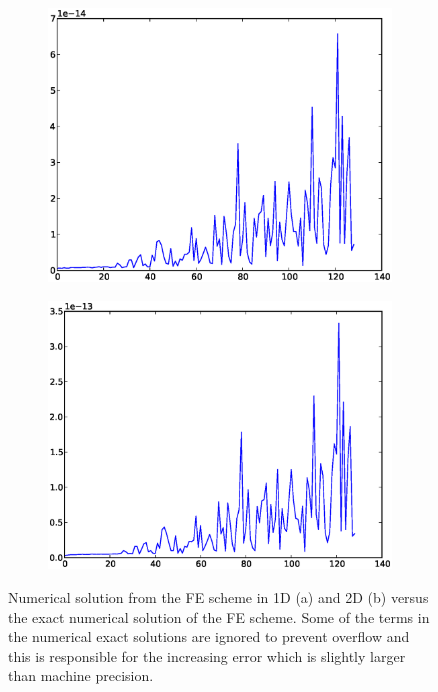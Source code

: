 \begin{figure}[H]
 \centering
 \begin{subfigure}{0.49\textwidth}
 \includegraphics[width=\textwidth]{Figures/exact_numerical_1d_n130.eps}
  \caption{}
  \label{numerical_exact_FE:1D}
 \end{subfigure}
 \begin{subfigure}{0.49\textwidth}
 \includegraphics[width=\textwidth]{Figures/exact_numerical_2d_n130.eps}
  \caption{}
  \label{numerical_exact_FE:2D}
 \end{subfigure}
 \caption[Numerical exact error plots FE]{Numerical solution from the FE scheme in 1D (a) and 2D (b) versus the exact numerical solution of the FE scheme.
 Some of the terms in the numerical exact solutions are ignored to prevent overflow and this is responsible for the increasing error which is slightly larger than machine precision.}
 \label{numerical_exact_FE}
\end{figure}


